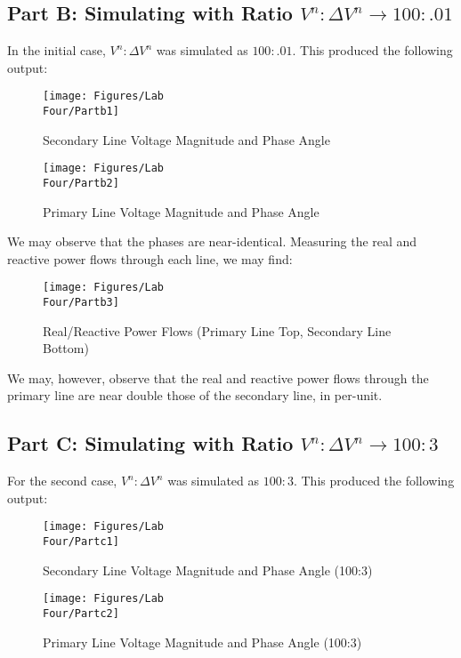 \documentclass[
	letterpaper, %
	10pt, %
]{CSUniSchoolLabReport}
\begin{document}
\subsection{Part B: Simulating with Ratio $V^n:\Delta V^n\to 100:.01$}

In the initial case, $V^n:\Delta V^n$ was simulated as $100:.01$. This produced the following output:

\begin{figure}[H]
  \centering
  \texttt{[image: Figures/Lab\\ Four/Partb1]}
  \caption{Secondary Line Voltage Magnitude and Phase Angle}
  \label{fig:2}
\end{figure}

\begin{figure}[H]
  \centering
  \texttt{[image: Figures/Lab\\ Four/Partb2]}
  \caption{Primary Line Voltage Magnitude and Phase Angle}
  \label{fig:3}
\end{figure}

We may observe that the phases are near-identical. Measuring the real and reactive power flows through each line, we may find:

\begin{figure}[H]
  \centering
  \texttt{[image: Figures/Lab\\ Four/Partb3]}
  \caption{Real/Reactive Power Flows (Primary Line Top, Secondary Line Bottom)}
  \label{fig:4}
\end{figure}

We may, however, observe that the real and reactive power flows through the primary line are near double those of the secondary line, in per-unit.

\subsection{Part C: Simulating with Ratio $V^n:\Delta V^n\to 100:3$}

For the second case, $V^n:\Delta V^n$ was simulated as $100:3$. This produced the following output:

\begin{figure}[H]
  \centering
  \texttt{[image: Figures/Lab\\ Four/Partc1]}
  \caption{Secondary Line Voltage Magnitude and Phase Angle (100:3)}
  \label{fig:5}
\end{figure}

\begin{figure}[H]
  \centering
  \texttt{[image: Figures/Lab\\ Four/Partc2]}
  \caption{Primary Line Voltage Magnitude and Phase Angle (100:3)}
  \label{fig:6}
\end{figure}
\end{document}
